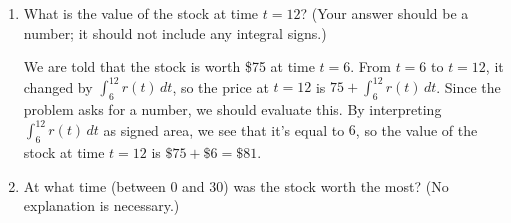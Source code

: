 \documentclass{article}
\begin{document}
\begin{enumerate}
\begin{enumerate}
  \item
    \begin{problem}[\vfill]
      What is the value of the stock at time $t = 12$?  (Your answer should
      be a number; it should not include any integral signs.) 
    \end{problem}

    \begin{solution}
      We are told that the stock is worth \$75 at time $t = 6$.  From $t =
      6$ to $t = 12$, it changed by $\displaystyle \int_6^{12} r(t)\,dt$,
      so the price at $t = 12$ is $75 + \displaystyle \int_6^{12}
      r(t)\,dt$.  Since the problem asks for a number, we should evaluate
      this.  By interpreting $\displaystyle \int_6^{12} r(t)\,dt$ as
      signed area, we see that it's equal to $6$, so the value of the
      stock at time $t=12$ is $\$75 + \$6 = \boxed{\$81}$.
    \end{solution}

  \item \label{spring2012-mb-midterm2-1d}
    \begin{problem}[\vfill]
      At what time (between $0$ and $30$) was the stock worth the most?
      (No explanation is necessary.)
    \end{problem}


\end{enumerate}
\end{enumerate}
\end{document}
